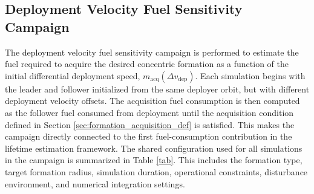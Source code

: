 \subsection{Deployment Velocity Fuel Sensitivity Campaign}
\label{sec:deploy_sensitivity_campaign}

The deployment velocity fuel sensitivity campaign is performed to estimate the fuel required to acquire the desired concentric formation as a function of the initial differential deployment speed, $m_{\mathrm{acq}}(\Delta v_{\mathrm{dep}})$. Each simulation begins with the leader and follower initialized from the same deployer orbit, but with different deployment velocity offsets. The acquisition fuel consumption is then computed as the follower fuel consumed from deployment until the acquisition condition defined in Section \ref{sec:formation_acquisition_def} is satisfied. This makes the campaign directly connected to the first fuel-consumption contribution in the lifetime estimation framework. The shared configuration used for all simulations in the campaign is summarized in Table \ref{tab}. This includes the formation type, target formation radius, simulation duration, operational constraints, disturbance environment, and numerical integration settings.

